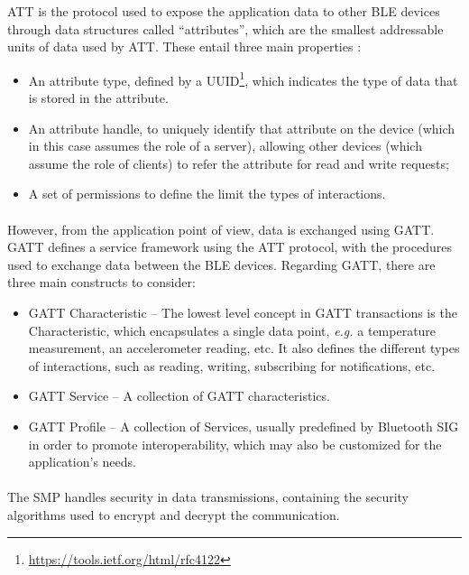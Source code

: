 \acs{ATT} is the protocol used to expose the application data to other \acs{BLE} devices through data structures called ``attributes'', which are the smallest addressable units of data used by \acs{ATT}. These entail three main properties \cite{Specification1999}: 

\begin{itemize}
    \item An attribute type, defined by a \acf{UUID}\footnote{\url{https://tools.ietf.org/html/rfc4122}}, which indicates the type of data that is stored in the attribute.
    \item An attribute handle, to uniquely identify that attribute on the device (which in this case assumes the role of a server), allowing other devices (which assume the role of clients) to refer the attribute for read and write requests;
    \item A set of permissions to define the limit the types of interactions.
\end{itemize}

\paragraph{} However, from the application point of view, data is exchanged using \acf{GATT}. \acs{GATT} defines a service framework using the \acs{ATT} protocol, with the procedures used to exchange data between the \acs{BLE} devices. Regarding \acs{GATT}, there are three main constructs to consider:

\begin{itemize}
    \item \acs{GATT} Characteristic -- The lowest level concept in \acs{GATT} transactions is the Characteristic, which encapsulates a single data point, \textit{e.g.} a temperature measurement, an accelerometer reading, etc. It also defines the different types of interactions, such as reading, writing, subscribing for notifications, etc.
    \item \acs{GATT} Service -- A collection of \acs{GATT} characteristics.
    \item \acs{GATT} Profile -- A collection of Services, usually predefined by Bluetooth \acf{SIG} in order to promote interoperability, which may also be customized for the application's needs.
\end{itemize}

\paragraph{} The \acf{SMP} handles security in data transmissions, containing the security algorithms used to encrypt and decrypt the communication. %

